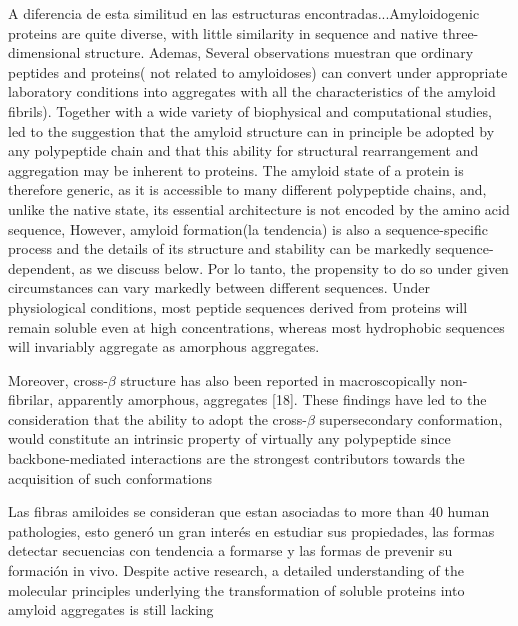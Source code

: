 A diferencia de esta similitud en las estructuras encontradas...Amyloidogenic proteins are quite diverse, with little similarity in sequence and native three-dimensional structure.
Ademas, Several observations muestran que ordinary peptides and proteins( not related to amyloidoses) can convert under appropriate laboratory conditions into aggregates with all the characteristics of the amyloid fibrils).
Together with a wide variety of biophysical and computational studies, 
led to the suggestion that the amyloid structure can in principle be adopted by any polypeptide chain and that this ability for structural rearrangement and aggregation may be inherent to proteins.
\cite{fandrich2002behaviour}
The amyloid state of a protein is therefore generic, as it is accessible to many different polypeptide chains, and, unlike the native state, its essential architecture is not encoded by the amino acid sequence,
However, amyloid formation(la tendencia) is also a sequence-specific process and the details of its structure and stability can be markedly sequence-dependent, as we discuss below.
Por lo tanto, the propensity to do so under given circumstances can vary markedly between different sequences.
Under physiological conditions, most peptide sequences derived from proteins will remain soluble even at high concentrations, whereas most hydrophobic sequences will invariably aggregate as amorphous aggregates.

Moreover, cross-$\beta$ structure has also been reported in macroscopically non-fibrilar, apparently amorphous, aggregates [18]. These findings have led to the consideration
that the ability to adopt the cross-$\beta$ supersecondary conformation, would constitute an intrinsic property of virtually any polypeptide since backbone-mediated
interactions are the strongest contributors towards the acquisition of such conformations








Las fibras amiloides se consideran que estan asociadas to more than 40 human pathologies, esto generó un gran interés en estudiar sus propiedades, 
las formas detectar secuencias con tendencia a formarse y las formas de prevenir su formación in vivo.
Despite active research, a detailed understanding of the molecular principles underlying the transformation of soluble proteins into amyloid aggregates is still lacking

